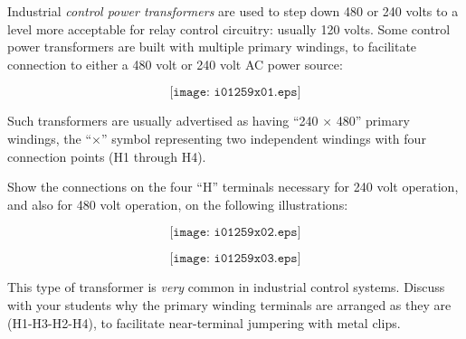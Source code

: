 

Industrial {\it control power transformers} are used to step down 480 or 240 volts to a level more acceptable for relay control circuitry: usually 120 volts.  Some control power transformers are built with multiple primary windings, to facilitate connection to either a 480 volt or 240 volt AC power source:

$$\texttt{[image: i01259x01.eps]}$$

Such transformers are usually advertised as having ``240 $\times$ 480'' primary windings, the ``$\times$'' symbol representing two independent windings with four connection points (H1 through H4).

Show the connections on the four ``H'' terminals necessary for 240 volt operation, and also for 480 volt operation, on the following illustrations:

$$\texttt{[image: i01259x02.eps]}$$







$$\texttt{[image: i01259x03.eps]}$$







This type of transformer is {\it very} common in industrial control systems.  Discuss with your students why the primary winding terminals are arranged as they are (H1-H3-H2-H4), to facilitate near-terminal jumpering with metal clips.




